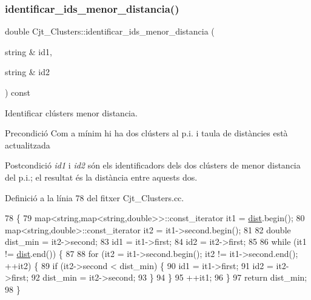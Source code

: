 \subsubsection{\texorpdfstring{identificar\+\_\+ids\+\_\+menor\+\_\+distancia()}{identificar\_ids\_menor\_distancia()}}
{\footnotesize\ttfamily double Cjt\+\_\+\+Clusters\+::identificar\+\_\+ids\+\_\+menor\+\_\+distancia (\begin{DoxyParamCaption}\item[{string \&}]{id1,  }\item[{string \&}]{id2 }\end{DoxyParamCaption}) const\hspace{0.3cm}{\ttfamily [private]}}



Identificar clústers menor distancia. 

\begin{DoxyPrecond}{Precondició}
Com a mínim hi ha dos clústers al p.\+i. i taula de distàncies està actualitzada 
\end{DoxyPrecond}
\begin{DoxyPostcond}{Postcondició}
{\itshape id1} i {\itshape id2} són els identificadors dels dos clústers de menor distancia del p.\+i.; el resultat és la distància entre aquests dos. 
\end{DoxyPostcond}


Definició a la línia 78 del fitxer Cjt\+\_\+\+Clusters.\+cc.


\begin{DoxyCode}
78                                                                                    \{    
79     map<string,map<string,double>>::const\_iterator it1 = \hyperlink{class_cjt___clusters_afde449634787205786301b40e053fe91}{dist}.begin();
80     map<string,double>::const\_iterator it2 = it1->second.begin();
81     
82     \textcolor{keywordtype}{double} dist\_min = it2->second;
83     id1 = it1->first;
84     id2 = it2->first;
85 
86     \textcolor{keywordflow}{while} (it1 != \hyperlink{class_cjt___clusters_afde449634787205786301b40e053fe91}{dist}.end()) \{
87 
88         \textcolor{keywordflow}{for} (it2 = it1->second.begin(); it2 != it1->second.end(); ++it2) \{
89             \textcolor{keywordflow}{if} (it2->second < dist\_min) \{
90                 id1 = it1->first;
91                 id2 = it2->first;
92                 dist\_min = it2->second;
93             \}
94         \}
95         ++it1;
96     \}
97     \textcolor{keywordflow}{return} dist\_min;
98 \}
\end{DoxyCode}
\mbox{\label{class_cjt___clusters_a7bbb88f22b1ec3a53302f646813c4602}} 
